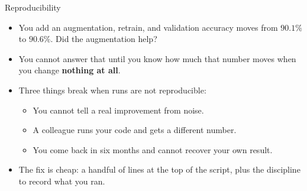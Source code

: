
\begin{frame}{Reproducibility}
\begin{itemize}
    \item You add an augmentation, retrain, and validation accuracy moves from $90.1\%$ to $90.6\%$. Did the augmentation help?
    \item You cannot answer that until you know how much that number moves when you change \textbf{nothing at all}.
    \item Three things break when runs are not reproducible:
    \begin{itemize}
        \item You cannot tell a real improvement from noise.
        \item A colleague runs your code and gets a different number.
        \item You come back in six months and cannot recover your own result.
    \end{itemize}
    \item The fix is cheap: a handful of lines at the top of the script, plus the discipline to record what you ran.
\end{itemize}
\end{frame}

